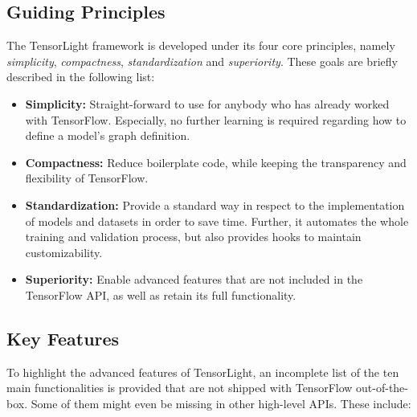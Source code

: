\subsection{Guiding Principles}

The TensorLight framework is developed under its four core principles, namely \textit{simplicity}, \textit{compactness}, \textit{standardization} and \textit{superiority}. These goals are briefly described in the following list:

\begin{itemize}
\item \textbf{Simplicity:} Straight-forward to use for anybody who has already worked with TensorFlow. Especially, no further learning is required regarding how to define a model's graph definition.
\item \textbf{Compactness:} Reduce boilerplate code, while keeping the transparency and flexibility of TensorFlow. 
\item \textbf{Standardization:} Provide a standard way in respect to the implementation of models and datasets in order to save time. Further, it automates the whole training and validation process, but also provides hooks to maintain customizability.
\item \textbf{Superiority:} Enable advanced features that are not included in the TensorFlow API, as well as retain its full functionality.
\end{itemize}


\subsection{Key Features}

To highlight the advanced features of TensorLight, an incomplete list of the ten main functionalities is provided that are not shipped with TensorFlow out-of-the-box. Some of them might even be missing in other high-level APIs. These include:

